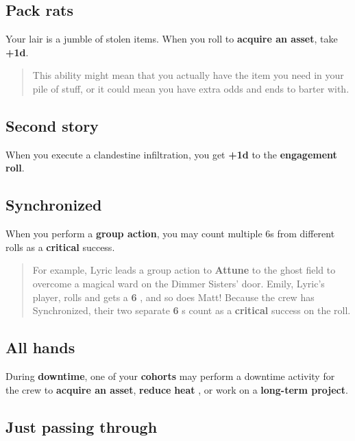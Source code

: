 \documentclass[11pt,oneside]{book}
\newcommand{\gameterm}[1]{\textbf{#1}}
\begin{document}
\subsection{Pack rats}

Your lair is a jumble of stolen items. When you roll to \textbf{acquire an asset}, take \textbf{+1d}.

\begin{quote}
	This ability might mean that you actually have the item you need in your pile of stuff, or it could mean you have extra odds and ends to barter with.
\end{quote} 

\subsection{Second story}

When you execute a clandestine infiltration, you get \textbf{+1d} to the \textbf{engagement roll}.

\subsection{Synchronized}

When you perform a \textbf{group action}, you may count multiple 6s from different rolls as a \gameterm{critical}  success.

\begin{quote}
	For example, Lyric leads a group action to \gameterm{Attune}  to the ghost field to overcome a magical ward on the Dimmer Sisters’ door. Emily, Lyric’s player, rolls and gets a \gameterm{6} , and so does Matt! Because the crew has Synchronized, their two separate \gameterm{6} s count as a \gameterm{critical}  success on the roll.
\end{quote} 

\subsection{All hands}

During \textbf{downtime}, one of your \textbf{cohorts} may perform a downtime activity for the crew to \textbf{acquire an asset}, \textbf{reduce} \gameterm{heat} , or work on a \textbf{long-term project}.

\subsection{Just passing through}
\end{document}
